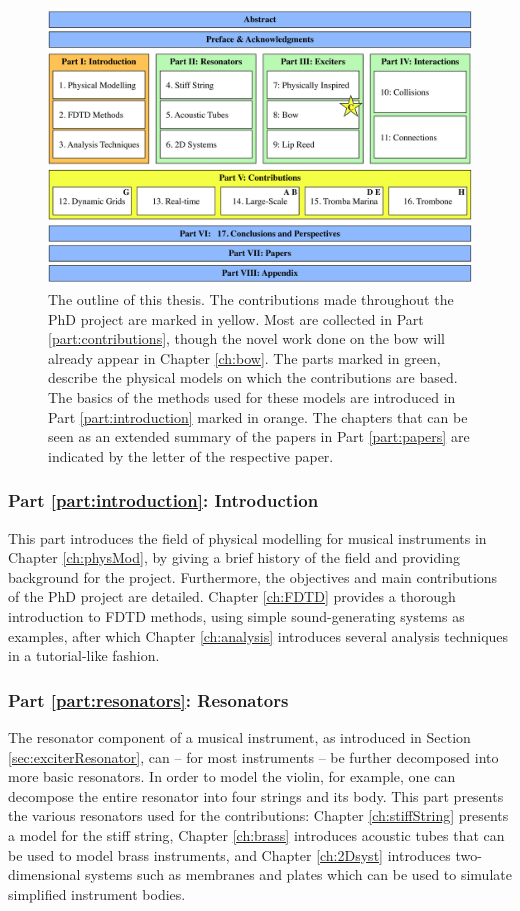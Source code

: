 \begin{figure}[h]
    \centering
    \includegraphics[width=\textwidth]{figures/intro/thesisOverview.pdf}
    \caption{\label{fig:thesisOutline} The outline of this thesis. The contributions made throughout the PhD project are marked in yellow. Most are collected in Part \ref{part:contributions}, though the novel work done on the bow will already appear in Chapter \ref{ch:bow}. The parts marked in green, describe the physical models on which the contributions are based. The basics of the methods used for these models are introduced in Part \ref{part:introduction} marked in orange. The chapters that can be seen as an extended summary of the papers in Part \ref{part:papers} are indicated by the letter of the respective paper.}
\end{figure}

\subsubsection{Part \ref{part:introduction}: Introduction}
This part introduces the field of physical modelling for musical instruments in Chapter \ref{ch:physMod}, by giving a brief history of the field and providing background for the project. Furthermore, the objectives and main contributions of the PhD project are detailed. Chapter \ref{ch:FDTD} provides a thorough introduction to FDTD methods, using simple sound-generating systems as examples, after which Chapter \ref{ch:analysis} introduces several analysis techniques in a tutorial-like fashion.

\subsubsection{Part \ref{part:resonators}: Resonators}
The resonator component of a musical instrument, as introduced in Section \ref{sec:exciterResonator}, can -- for most instruments -- be further decomposed into more basic resonators. In order to model the violin, for example, one can decompose the entire resonator into four strings and its body. This part presents the various resonators used for the contributions: Chapter \ref{ch:stiffString} presents a model for the stiff string, Chapter \ref{ch:brass} introduces acoustic tubes that can be used to model brass instruments, and Chapter \ref{ch:2Dsyst} introduces two-dimensional systems such as membranes and plates which can be used to simulate simplified instrument bodies.


